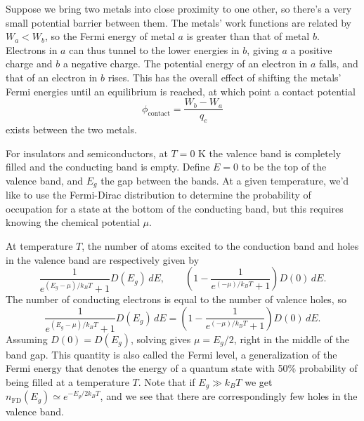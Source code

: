 \documentclass[../p052main.tex]{subfiles}
\begin{document}
Suppose we bring two metals into close proximity to one other, so there's a very small potential barrier between them.
The metals' work functions are related by $W_a < W_b$, so the Fermi energy of metal $a$ is greater than that of metal $b$.
Electrons in $a$ can thus tunnel to the lower energies in $b$, giving $a$ a positive charge and $b$ a negative charge.
The potential energy of an electron in $a$ falls, and that of an electron in $b$ rises.
This has the overall effect of shifting the metals' Fermi energies until an equilibrium is reached, at which point a contact potential
\[ \phi_\textrm{contact} = \frac{W_b - W_a}{q_e} \]
exists between the two metals.

For insulators and semiconductors, at $T = 0 \textrm{ K}$ the valence band is completely filled and the conducting band is empty.
Define $E=0$ to be the top of the valence band, and $E_g$ the gap between the bands.
At a given temperature, we'd like to use the Fermi-Dirac distribution to determine the probability of occupation for a state at the bottom of the conducting band, but this requires knowing the chemical potential $\mu$.

At temperature $T$, the number of atoms excited to the conduction band and holes in the valence band are respectively given by
\[ \frac{1}{e^{(E_g - \mu) / k_BT} + 1} D(E_g) \,dE, \qquad \left( 1 - \frac{1}{e^{(-\mu) / k_BT} + 1} \right) D(0) \,dE. \]
The number of conducting electrons is equal to the number of valence holes, so
\[ \frac{1}{e^{(E_g - \mu) / k_BT} + 1} D(E_g) \,dE = \left( 1 - \frac{1}{e^{(-\mu) / k_BT} + 1} \right) D(0) \,dE. \]
Assuming $D(0) = D(E_g)$, solving gives $\mu = E_g / 2$, right in the middle of the band gap.
This quantity is also called the Fermi level, a generalization of the Fermi energy that denotes the energy of a quantum state with 50\% probability of being filled at a temperature $T$.
Note that if $E_g \gg k_BT$ we get $n_\textrm{FD}(E_g) \simeq e^{-E_g / 2k_BT}$, and we see that there are correspondingly few holes in the valence band.
\end{document}
